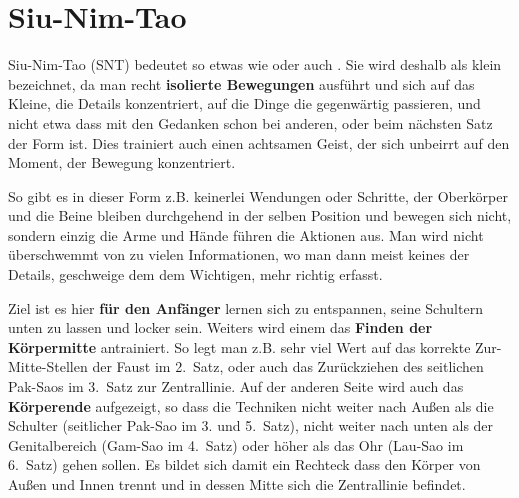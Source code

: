 %



\section{Siu-Nim-Tao}





Siu-Nim-Tao (SNT) bedeutet so etwas wie  oder auch . Sie wird deshalb als klein bezeichnet, da man recht \textbf{isolierte Bewegungen} ausf\"uhrt und sich auf das Kleine, die Details konzentriert, auf die Dinge die gegenw\"artig passieren, und nicht etwa dass mit den Gedanken schon bei anderen, oder beim n\"achsten Satz der Form ist. Dies trainiert auch einen achtsamen Geist, der sich unbeirrt auf den Moment, der Bewegung konzentriert.

	So gibt es in dieser Form z.B. keinerlei Wendungen oder Schritte, der Oberk\"orper und die Beine bleiben durchgehend in der selben Position und bewegen sich nicht, sondern einzig die Arme und H\"ande f\"uhren die Aktionen aus. Man wird nicht \"uberschwemmt von zu vielen Informationen, wo man dann meist keines der Details, geschweige dem dem Wichtigen, mehr richtig erfasst.

Ziel ist es hier \textbf{f\"ur den Anf\"anger} lernen sich zu entspannen, seine Schultern unten zu lassen und locker sein. Weiters wird einem das \textbf{Finden der K\"orpermitte} antrainiert. So legt man z.B. sehr viel Wert auf das korrekte Zur-Mitte-Stellen der Faust im 2.~Satz, oder auch das Zur\"uckziehen des seitlichen Pak-Saos im 3.~Satz zur Zentrallinie. Auf der anderen Seite wird auch das \textbf{K\"orperende} aufgezeigt, so dass die Techniken nicht weiter nach Au{\ss}en als die Schulter (seitlicher Pak-Sao im 3. und 5.~Satz), nicht weiter nach unten als der Genitalbereich (Gam-Sao im 4.~Satz) oder h\"oher als das Ohr (Lau-Sao im 6.~Satz) gehen sollen. Es bildet sich damit ein Rechteck dass den K\"orper von Au{\ss}en und Innen trennt und in dessen Mitte sich die Zentrallinie befindet.


